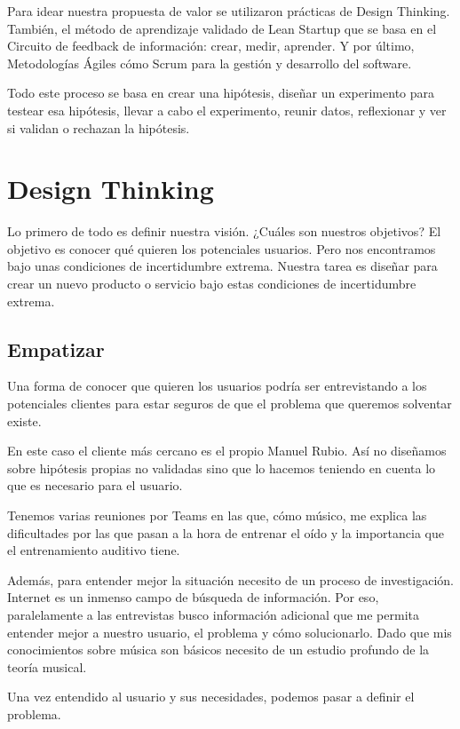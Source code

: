 \documentclass[12pt,twoside,titlepage]{report}
\begin{document}
Para idear nuestra propuesta de valor se utilizaron prácticas de Design Thinking. También, el método de aprendizaje validado de Lean Startup que se basa en el Circuito de feedback de información: crear, medir, aprender. Y por último, Metodologías Ágiles cómo Scrum para la gestión y desarrollo del software.

Todo este proceso se basa en crear una hipótesis, diseñar un experimento para testear esa hipótesis, llevar a cabo el experimento, reunir datos, reflexionar y ver si validan o rechazan la hipótesis.

\section{Design Thinking}
\label{sec:DesignThinking}
Lo primero de todo es definir nuestra visión. ¿Cuáles son nuestros objetivos? El objetivo es conocer qué quieren los potenciales usuarios. Pero nos encontramos bajo unas condiciones de incertidumbre extrema. Nuestra tarea es diseñar para crear un nuevo producto o servicio bajo estas condiciones de incertidumbre extrema.

\subsection{Empatizar}

Una forma de conocer que quieren los usuarios podría ser entrevistando a los potenciales clientes para estar seguros de que el problema que queremos solventar existe.

En este caso el cliente más cercano es el propio Manuel Rubio. Así no diseñamos sobre hipótesis propias no validadas sino que lo hacemos teniendo en cuenta lo que es necesario para el usuario.

Tenemos varias reuniones por Teams en las que, cómo músico, me explica las dificultades por las que pasan a la hora de entrenar el oído y la importancia que el entrenamiento auditivo tiene.

Además, para entender mejor la situación necesito de un proceso de investigación. Internet es un inmenso campo de búsqueda de información. Por eso, paralelamente a las entrevistas busco información adicional que me permita entender mejor a nuestro usuario, el problema y cómo solucionarlo. Dado que mis conocimientos sobre música son básicos necesito de un estudio profundo de la teoría musical. 

Una vez entendido al usuario y sus necesidades, podemos pasar a definir el problema.
\end{document}
